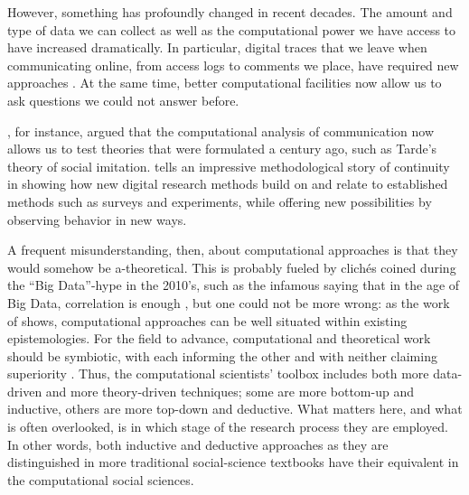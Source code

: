 However, something has profoundly changed in recent decades. The amount
and type of data we can collect as well as the computational power we
have access to have increased dramatically. In particular, digital
traces that we leave when communicating online, from access logs to
comments we place, have required new approaches \citep[e.g.,][]{Trilling2017b}. At the same time, better computational
facilities now allow us to ask questions we could not answer before.

\citet{Gonzalez-Bailon2017}, for instance, argued that the
computational analysis of communication now allows us to test theories
that were formulated a century ago, such as Tarde's theory of
social imitation. \citet{Salganik2019} tells an impressive
methodological story of continuity in showing how new digital
research methods build on and relate to established methods such as
surveys and experiments, while offering new possibilities by observing
behavior in new ways.

A frequent misunderstanding, then, about computational approaches is
that they would somehow be a-theoretical. This is probably fueled by
clich\'{e}s coined during the ``Big Data''-hype in the 2010's, such as the
infamous saying that in the age of Big Data, correlation is enough \citep{Mayer2013},
but one could not be more wrong: as the work of \cite{Kitchin2014,Kitchin2014data} shows, computational approaches can
be well situated within existing epistemologies.
For the field to advance, computational and theoretical work should be symbiotic, with each informing the other
and with neither claiming superiority \cite{margolin19}.
Thus, the computational
scientists' toolbox includes both more data-driven and more
theory-driven techniques; some are more bottom-up and inductive,
others are more top-down and deductive. What matters here, and what is
often overlooked, is in which stage of the research process they are
employed. In other words, both inductive and deductive approaches as
they are distinguished in more traditional social-science textbooks
\citep[e.g.,][]{Bryman2012} have their equivalent in the computational
social sciences.

